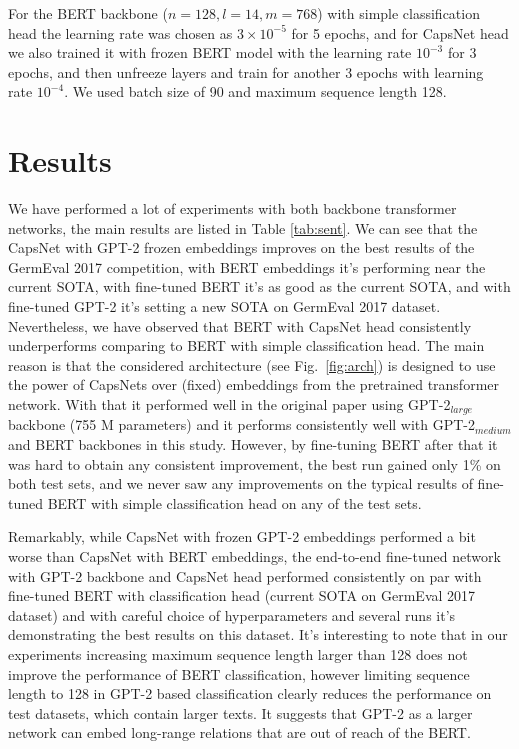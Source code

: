 \documentclass{article}
\begin{document}
For the BERT backbone ($n=128, l = 14, m=768$) with simple classification head the learning rate was chosen as $3\times 10^{-5}$ for 5 epochs, and for CapsNet head we also trained it with frozen BERT model with the learning rate $10^{-3}$ for 3 epochs, and then unfreeze layers and train for another 3 epochs with learning rate $10^{-4}$. We used batch size of 90 and maximum sequence length 128.



\section{Results}

We have performed a lot of experiments with both backbone transformer networks, the main results are listed in Table \ref{tab:sent}. We can see that the CapsNet with GPT-2 frozen embeddings improves on the best results of the GermEval 2017 competition, with BERT embeddings it's performing near the current SOTA, with fine-tuned BERT it's as good as the current SOTA, and with fine-tuned GPT-2 it's setting a new SOTA on GermEval 2017 dataset. Nevertheless, we have observed that BERT with CapsNet head consistently underperforms comparing to BERT with simple classification head. The main reason is that the considered architecture (see Fig.~\ref{fig:arch}) is designed to use the power of CapsNets over (fixed) embeddings from the pretrained transformer network. With that it performed well in the original paper using GPT-2$_{large}$ backbone (755 M parameters) \cite{heinsen2019algorithm} and it performs consistently well with GPT-2$_{medium}$ and BERT backbones in this study. However, by fine-tuning BERT after that it was hard to obtain any consistent improvement, the best run gained only 1\% on both test sets, and we never saw any improvements on the typical results of fine-tuned BERT with simple classification head on any of the test sets. 

Remarkably, while CapsNet with frozen GPT-2 embeddings performed a bit worse than CapsNet with BERT embeddings, the end-to-end fine-tuned network with GPT-2 backbone and CapsNet head performed consistently on par with fine-tuned BERT with classification head (current SOTA on GermEval 2017 dataset) and with careful choice of hyperparameters and several runs it's demonstrating the best results on this dataset.  
It's interesting to note that in our experiments increasing maximum sequence length larger than 128 does not improve the performance of BERT classification, however limiting sequence length to 128 in GPT-2 based classification clearly reduces the performance on test datasets, which contain larger texts. It suggests that GPT-2 as a larger network can embed long-range relations that are out of reach of the BERT. 
\end{document}
